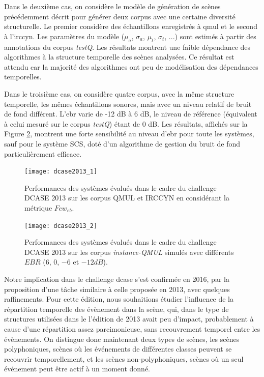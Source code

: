   Dans le deuxième cas, on considère le modèle de génération de scènes précédemment décrit pour générer deux corpus avec une certaine diversité structurelle. Le premier considère des échantillons enregistrés à qmul et le second à l'irccyn. Les paramètres du modèle ($\mu_a$, $\sigma_a$, $\mu_t$, $\sigma_t$, ...) sont estimés à partir des annotations du corpus \emph{testQ}. Les résultats montrent une faible dépendance des algorithmes à la structure temporelle des scènes analysées. Ce résultat est attendu car la majorité des algorithmes ont peu de modélisation des dépendances temporelles.

  Dans le troisième cas, on considère quatre corpus, avec la même structure temporelle, les mêmes échantillons sonores, mais avec un niveau relatif de bruit de fond différent. L'ebr varie de -12 dB à 6 dB, le niveau de référence (équivalent à celui mesuré sur le corpus \emph{testQ})  étant de 0 dB. Les résultats, affichés sur la Figure \ref{fig:ebr}, montrent une forte sensibilité au niveau d'ebr pour toute les systèmes, sauf pour le système SCS, doté d'un algorithme de gestion du bruit de fond particulièrement efficace\cite{lafayhal-01111381}.

  \begin{figure}[t]
    \texttt{[image: dcase2013\_1]}
    \caption{Performances des systèmes évalués dans le cadre du challenge DCASE 2013 sur les corpus QMUL et IRCCYN en considérant la métrique $Fcw_{eb}$.}
    \label{fig:irccyn}
    \vspace{-4em}
  \end{figure}

  \begin{figure}[t]
    \begin{center}
      \texttt{[image: dcase2013\_2]}
      \caption{Performances des systèmes évalués dans le cadre du challenge DCASE 2013 sur les corpus \emph{instance-QMUL} simulés avec différents $EBR$ ($6$, $0$, $-6$ et $-12dB$).}
      \label{fig:ebr}
    \end{center}
    \vspace{-4em}
  \end{figure}

  Notre implication dans le challenge dcase s'est confirmée en 2016\cite{mesa}, par la proposition d'une tâche similaire à celle proposée en 2013, avec quelques raffinements. Pour cette édition, nous souhaitions étudier l'influence de la répartition temporelle des évènement dans la scène, qui, dans le type de structures utilisées dans le l'édition de 2013 avait peu d'impact, probablement à cause d'une répartition assez parcimonieuse, sans recouvrement temporel entre les évènements. On distingue donc maintenant deux types de scènes, les scènes polyphoniques, scènes où les événements de différentes classes peuvent se recouvrir temporellement, et les scènes non-polyphoniques, scènes où un seul événement peut être actif à un moment donné.

